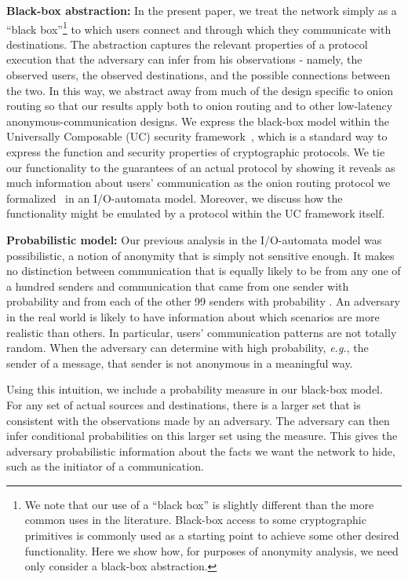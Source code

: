 \documentclass[prodmode,acmtissec]{acmsmall}
\begin{document}
{\bf Black-box abstraction:}
In the present paper, we treat the network simply as a ``black box''\footnote{We note that our use of a ``black box'' is slightly different than the more common uses in the literature. Black-box access to some cryptographic primitives is commonly used as a starting point to achieve some other desired functionality. Here we show how, for purposes of anonymity analysis, we need only consider a black-box abstraction.} to which users connect and
through which they communicate with destinations.  The abstraction
captures the relevant properties of a protocol execution that the
adversary can infer from his observations - namely, the observed
users, the observed destinations, and the possible connections between
the two.  In this way, we abstract away from much of the design
specific to onion routing so that our results apply both to onion
routing and to other low-latency anonymous-communication designs. 
We express the black-box model within the Universally Composable (UC) security
framework~\cite{cryptoeprint:2000:067}, which is a standard way to express the  
function and security properties of cryptographic protocols. We tie our functionality to 
the guarantees of an actual protocol by showing it reveals as much information about users' 
communication as the onion routing protocol we formalized~\cite{FC07} in an I/O-automata model. Moreover, we discuss how the functionality might be emulated by a protocol within the UC framework itself.

{\bf Probabilistic model:}
Our previous analysis in the I/O-automata model was possibilistic, a
notion of anonymity that is simply not sensitive enough. It makes no
distinction between communication that is equally likely to be from
any one of a hundred senders and communication that came from one
sender with probability  and from each of the other 99 senders
with probability .  An adversary in the real world is likely
to have information about which scenarios are more realistic than
others.  In particular, users' communication patterns are not totally
random.  When the adversary can determine with high probability,
\emph{e.g.}, the sender of a message, that sender is not anonymous in
a meaningful way.

Using this intuition, we include a probability measure in our black-box model.  For any set of actual sources and destinations, there is a larger set that is consistent with the observations made by an adversary.  The adversary can then infer conditional probabilities on this larger set using the measure.  This gives the adversary probabilistic information about the facts we want the network to hide, such as the initiator of a communication.
\end{document}
